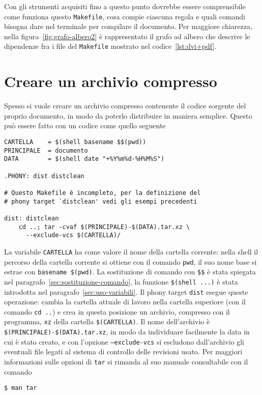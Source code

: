 Con gli strumenti acquisiti fino a questo punto dovrebbe essere comprensibile
come funziona questo \texttt{Makefile}, cosa compie ciascuna regola e quali
comandi bisogna dare nel terminale per compilare il documento.  Per maggiore
chiarezza, nella figura~\ref{fig:grafo-albero2} è rappresentato il grafo ad
albero che descrive le dipendenze fra i file del \texttt{Makefile} mostrato nel
codice~\ref{lst:dvi+pdf}.

\section{Creare un archivio compresso}
\label{sec:creare-archivio}

Spesso si vuole creare un archivio compresso contenente il codice sorgente del
proprio documento, in modo da poterlo distribuire in maniera semplice.  Questo
può essere fatto con un codice come quello seguente
\begin{lstlisting}
CARTELLA	= $(shell basename $$(pwd))
PRINCIPALE	= documento
DATA		= $(shell date "+%Y%m%d-%H%M%S")

.PHONY: dist distclean

# Questo Makefile è incompleto, per la definizione del
# phony target `distclean' vedi gli esempi precedenti

dist: distclean
	cd ..; tar -cvaf $(PRINCIPALE)-$(DATA).tar.xz \
	  --exclude-vcs $(CARTELLA)/
\end{lstlisting} %
La variabile \texttt{CARTELLA} ha come valore il nome della cartella corrente:
nella shell il percorso della cartella corrente si ottiene con il comando
\texttt{pwd}, il suo nome base si estrae con \texttt{basename \$(pwd)}.  La
sostituzione di comando con \texttt{\$\$} è stata spiegata nel
paragrafo~\ref{sec:sostituzione-comando}, la funzione \texttt{\$(shell ...)} è
stata introdotta nel paragrafo~\ref{sec:uso-variabili}.  Il phony target
\texttt{dist} esegue queste operazione: cambia la cartella attuale di lavoro
nella cartella superiore (con il comando \texttt{cd ..}) e crea in questa
posizione un archivio, compresso con il programma, \texttt{xz} della cartella
\texttt{\$(CARTELLA)}.  Il nome dell'archivio è
\texttt{\$(PRINCIPALE)-\$(DATA).tar.xz}, in modo da individuare facilmente la
data in cui è stato creato, e con l'opzione \texttt{--exclude-vcs} si escludono
dall'archivio gli eventuali file legati al sistema di controllo delle revisioni
usato.  Per maggiori informazioni sulle opzioni di \texttt{tar} si rimanda al
suo manuale consultabile con il comando
\begin{verbatim}
$ man tar
\end{verbatim}

